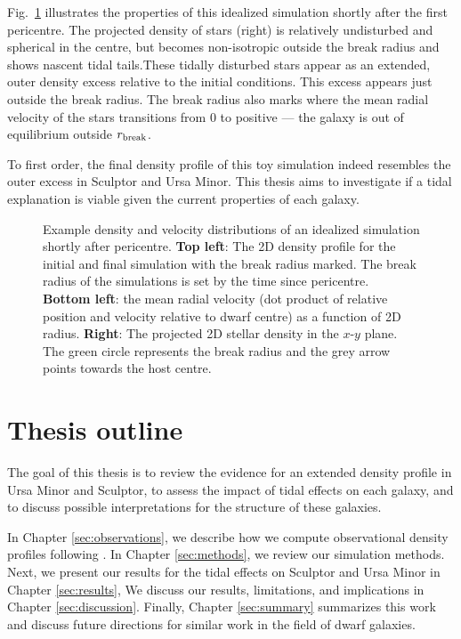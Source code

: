 Fig.~\ref{fig:idealized_break_radius} illustrates the properties of this
idealized simulation shortly after the first pericentre. The projected
density of stars (right) is relatively undisturbed and spherical in the
centre, but becomes non-isotropic outside the break radius and shows
nascent tidal tails.These tidally disturbed stars appear as an extended,
outer density excess relative to the initial conditions. This excess
appears just outside the break radius. The break radius also marks where
the mean radial velocity of the stars transitions from 0 to positive ---
the galaxy is out of equilibrium outside \(r_{\rm break}\).

To first order, the final density profile of this toy simulation indeed
resembles the outer excess in Sculptor and Ursa Minor. This thesis aims
to investigate if a tidal explanation is viable given the current
properties of each galaxy.

\begin{figure}
\centering
{}
\caption[Break radius validation]{Example density and velocity
distributions of an idealized simulation shortly after pericentre.
\textbf{Top left}: The 2D density profile for the initial and final
simulation with the break radius marked. The break radius of the
simulations is set by the time since pericentre. \textbf{Bottom left}:
the mean radial velocity (dot product of relative position and velocity
relative to dwarf centre) as a function of 2D radius. \textbf{Right}:
The projected 2D stellar density in the \(x\)-\(y\) plane. The green
circle represents the break radius and the grey arrow points towards the
host centre.}\label{fig:idealized_break_radius}
\end{figure}

\section{Thesis outline}\label{thesis-outline}

The goal of this thesis is to review the evidence for an extended
density profile in Ursa Minor and Sculptor, to assess the impact of
tidal effects on each galaxy, and to discuss possible interpretations
for the structure of these galaxies.

In Chapter \ref{sec:observations}, we describe how we compute
observational density profiles following \citet{jensen+2024}. In Chapter
\ref{sec:methods}, we review our simulation methods. Next, we present
our results for the tidal effects on Sculptor and Ursa Minor in Chapter
\ref{sec:results}, We discuss our results, limitations, and implications
in Chapter \ref{sec:discussion}. Finally, Chapter \ref{sec:summary}
summarizes this work and discuss future directions for similar work in
the field of dwarf galaxies.
